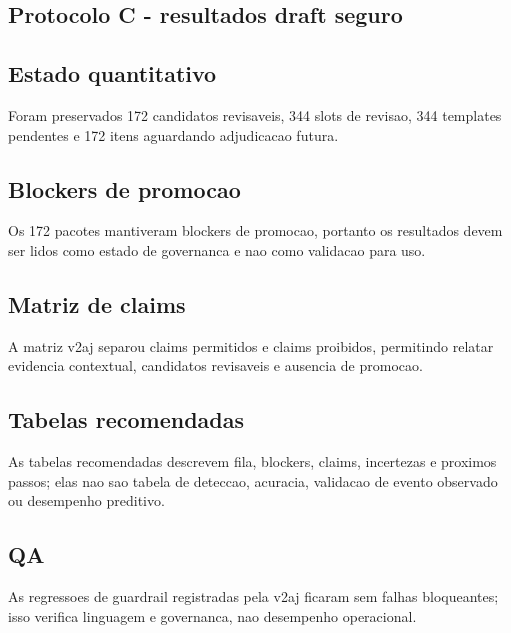 
\subsection{Protocolo C - resultados draft seguro}

\subsection{Estado quantitativo}
Foram preservados 172 candidatos revisaveis, 344 slots de revisao, 344 templates pendentes e 172 itens aguardando adjudicacao futura.

\subsection{Blockers de promocao}
Os 172 pacotes mantiveram blockers de promocao, portanto os resultados devem ser lidos como estado de governanca e nao como validacao para uso.

\subsection{Matriz de claims}
A matriz v2aj separou claims permitidos e claims proibidos, permitindo relatar evidencia contextual, candidatos revisaveis e ausencia de promocao.

\subsection{Tabelas recomendadas}
As tabelas recomendadas descrevem fila, blockers, claims, incertezas e proximos passos; elas nao sao tabela de deteccao, acuracia, validacao de evento observado ou desempenho preditivo.

\subsection{QA}
As regressoes de guardrail registradas pela v2aj ficaram sem falhas bloqueantes; isso verifica linguagem e governanca, nao desempenho operacional.
